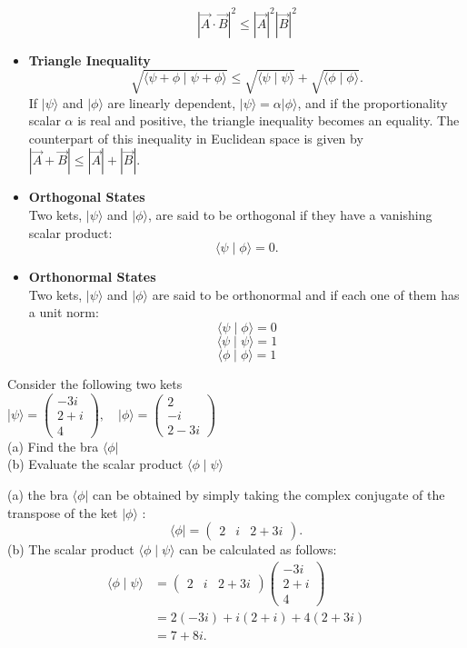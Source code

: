\begin{itemize}
$$
|\vec{A} \cdot \vec{B}|^{2} \leq|\vec{A}|^{2}|\vec{B}|^{2}
$$
\item \textbf{Triangle Inequality}\\
$$
\sqrt{\langle\psi+\phi \mid \psi+\phi\rangle} \leq \sqrt{\langle\psi \mid \psi\rangle}+\sqrt{\langle\phi \mid \phi\rangle} .
$$
If $|\psi\rangle$ and $|\phi\rangle$ are linearly dependent, $|\psi\rangle=\alpha|\phi\rangle$, and if the proportionality scalar $\alpha$ is real and positive, the triangle inequality becomes an equality. The counterpart of this inequality in Euclidean space is given by $|\vec{A}+\vec{B}| \leq|\vec{A}|+|\vec{B}|$.
\item \textbf{Orthogonal States}\\
Two kets, $|\psi\rangle$ and $|\phi\rangle$, are said to be orthogonal if they have a vanishing scalar product:
$$
\langle\psi \mid \phi\rangle=0 .
$$
\item \textbf{Orthonormal States}\\
Two kets, $|\psi\rangle $ and $|\phi \rangle $ are said to be orthonormal and if each one of them has a unit norm:\\
$$ \langle \psi \mid \phi \rangle =0$$ 
$$ \langle \psi \mid \psi \rangle =1$$ 
$$ \langle \phi \mid \phi \rangle =1$$ 
\end{itemize}
\begin{exercise}
	Consider the following two kets\\
	|$\psi\rangle=\left(\begin{array}{c}
		-3 i \\
		2+i \\
		4
	\end{array}\right), \quad|\phi\rangle=\left(\begin{array}{c}
		2 \\
		-i \\
		2-3 i
	\end{array}\right)$\\
	(a) Find the bra $\langle \phi |$ \\
	(b) Evaluate the scalar product $\langle \phi \mid \psi \rangle $
\end{exercise}
\begin{answer}
(a) the bra $\langle\phi|$ can be obtained by simply taking the complex conjugate of the transpose of the ket $|\phi\rangle$ :
	$$
	\langle\phi|=\left(\begin{array}{lll}
	2 & i & 2+3 i
	\end{array}\right) .
	$$
	(b) The scalar product $\langle\phi \mid \psi\rangle$ can be calculated as follows:
	$$
	\begin{aligned}
	\langle\phi \mid \psi\rangle &=\left(\begin{array}{lll}
	2 & i & 2+3 i
	\end{array}\right)\left(\begin{array}{c}
	-3 i \\
	2+i \\
	4
	\end{array}\right) \\
	&=2(-3 i)+i(2+i)+4(2+3 i) \\
	&=7+8 i .
	\end{aligned}
	$$
\end{answer}
